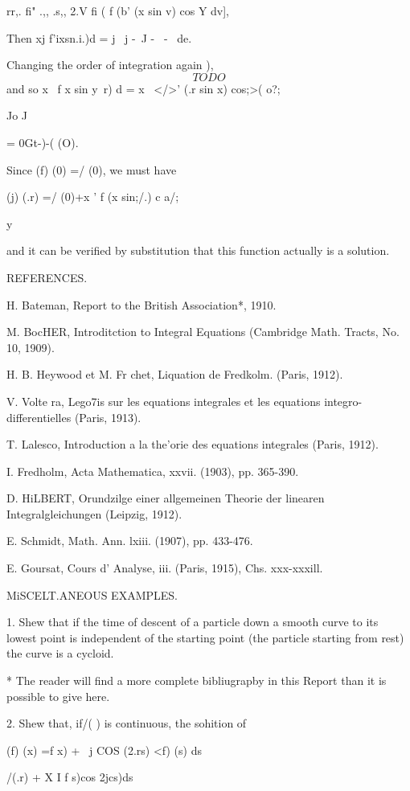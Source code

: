 {rr,. fi" .,, .s,, 2.V fi ( f (b' (x sin v) cos Y dv],

Then xj f'ixsn.i.)d = j \ j -~J -~ - \ de.

Changing the order of integration again ),
$$
TODO
$$
and so x \ f x sin y\ r) d = x \ </>' (.r sin x) cos;>( o?;

Jo J

= 0Gt-)-( (O).

Since (f) (0) =/ (0), we must have

(j) (.r) =/ (0)+x ' f (x sin;/.) c a/;

y

and it can be verified by substitution that this function actually is
a solution.

REFERENCES.

H. Bateman, Report to the British Association*, 1910.

M. BocHER, Introditction to Integral Equations (Cambridge Math.
Tracts, No. 10, 1909).

H. B. Heywood et M. Fr chet, Liquation de Fredkolm. (Paris, 1912).

V. Volte ra, Lego7is sur les equations integrales et les equations
integro-differentielles (Paris, 1913).

T. Lalesco, Introduction a la the'orie des equations integrales
(Paris, 1912).

I. Fredholm, Acta Mathematica, xxvii. (1903), pp. 365-390.

D. HiLBERT, Orundzilge einer allgemeinen Theorie der linearen
Integralgleichungen (Leipzig, 1912).

E. Schmidt, Math. Ann. lxiii. (1907), pp. 433-476.

E. Goursat, Cours d' Analyse, iii. (Paris, 1915), Chs. xxx-xxxill.

MiSCELT.ANEOUS EXAMPLES.

1. Shew that if the time of descent of a particle down a smooth curve
to its lowest point is independent of the starting point (the particle
starting from rest) the curve is a cycloid. 

* The reader will find a more complete bibliugrapby in this Report
than it is possible to give here.

%
%

2. Shew that, if/( ) is continuous, the sohition of

(f) (x) =f x) + \ j COS (2.rs) <f) (s) ds

/(.r) + X I f s)cos 2jcs)ds

}
